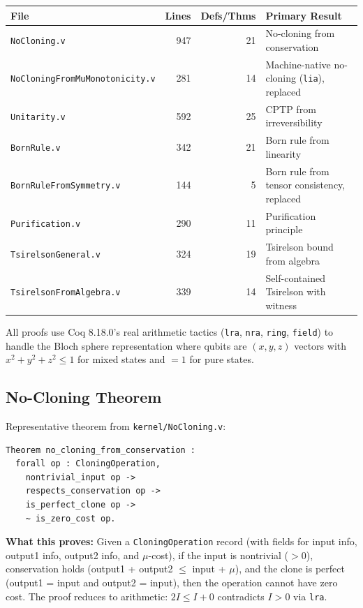 \begin{center}
\begin{tabular}{lrrl}
\toprule
\textbf{File} & \textbf{Lines} & \textbf{Defs/Thms} & \textbf{Primary Result} \\
\midrule
\texttt{NoCloning.v} & 947 & 21 & No-cloning from conservation \\
\texttt{NoCloningFromMuMonotonicity.v} & 281 & 14 & Machine-native no-cloning (\texttt{lia}), replaced \\
\texttt{Unitarity.v} & 592 & 25 & CPTP from irreversibility \\
\texttt{BornRule.v} & 342 & 21 & Born rule from linearity \\
\texttt{BornRuleFromSymmetry.v} & 144 & 5 & Born rule from tensor consistency, replaced \\
\texttt{Purification.v} & 290 & 11 & Purification principle \\
\texttt{TsirelsonGeneral.v} & 324 & 19 & Tsirelson bound from algebra \\
\texttt{TsirelsonFromAlgebra.v} & 339 & 14 & Self-contained Tsirelson with witness \\
\bottomrule
\end{tabular}
\end{center}

All proofs use Coq 8.18.0's real arithmetic tactics (\texttt{lra}, \texttt{nra}, \texttt{ring}, \texttt{field}) to handle the Bloch sphere representation where qubits are $(x,y,z)$ vectors with $x^2 + y^2 + z^2 \leq 1$ for mixed states and $= 1$ for pure states.

\subsection{No-Cloning Theorem}

Representative theorem from \texttt{kernel/NoCloning.v}:

\begin{lstlisting}
Theorem no_cloning_from_conservation :
  forall op : CloningOperation,
    nontrivial_input op ->
    respects_conservation op ->
    is_perfect_clone op ->
    ~ is_zero_cost op.
\end{lstlisting}

\textbf{What this proves:} Given a \texttt{CloningOperation} record (with fields for input info, output1 info, output2 info, and $\mu$-cost), if the input is nontrivial ($> 0$), conservation holds (output1 + output2 $\leq$ input + $\mu$), and the clone is perfect (output1 = input and output2 = input), then the operation cannot have zero cost. The proof reduces to arithmetic: $2I \leq I + 0$ contradicts $I > 0$ via \texttt{lra}.

